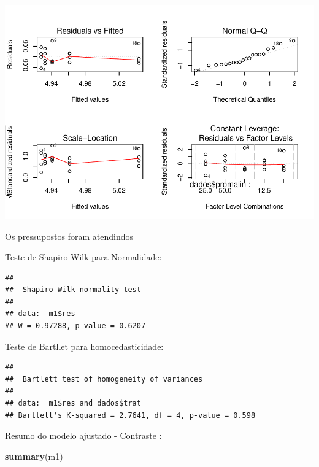 \documentclass[
]{book}
\newenvironment{Shaded}{\begin{snugshade}}{\end{snugshade}}
\newcommand{\KeywordTok}[1]{\textcolor[rgb]{0.13,0.29,0.53}{\textbf{#1}}}
\newcommand{\NormalTok}[1]{#1}
\newcommand{\OperatorTok}[1]{\textcolor[rgb]{0.81,0.36,0.00}{\textbf{#1}}}
\begin{document}
\includegraphics{TudodoR_files/figure-latex/unnamed-chunk-294-1.pdf}

Os pressupostos foram atendindos

Teste de Shapiro-Wilk para Normalidade:

\begin{Shaded}
\end{Shaded}

\begin{verbatim}
## 
##  Shapiro-Wilk normality test
## 
## data:  m1$res
## W = 0.97288, p-value = 0.6207
\end{verbatim}

Teste de Bartllet para homocedasticidade:

\begin{Shaded}
\end{Shaded}

\begin{verbatim}
## 
##  Bartlett test of homogeneity of variances
## 
## data:  m1$res and dados$trat
## Bartlett's K-squared = 2.7641, df = 4, p-value = 0.598
\end{verbatim}

Resumo do modelo ajustado - Contraste :

\begin{Shaded}
\begin{Highlighting}[]
\KeywordTok{summary}\NormalTok{(m1)}
\end{Highlighting}
\end{Shaded}
\end{document}
